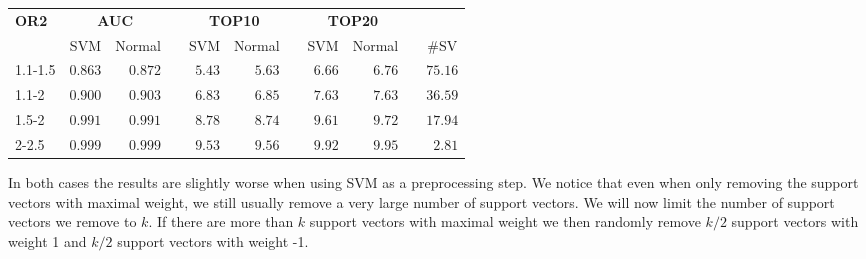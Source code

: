 \documentclass{article}\usepackage[]{graphicx}\usepackage[]{color}
\begin{document}
%
\begin{table}[H]
\begin{center}
\begin{tabular}{lrrcrrcrrcr}
\hline\hline
\multicolumn{1}{l}{\bfseries OR2}&\multicolumn{2}{c}{\bfseries AUC}&\multicolumn{1}{c}{\bfseries }&\multicolumn{2}{c}{\bfseries TOP10}&\multicolumn{1}{c}{\bfseries }&\multicolumn{2}{c}{\bfseries TOP20}&\multicolumn{1}{c}{\bfseries }&\multicolumn{1}{c}{\bfseries }\tabularnewline
\cline{2-3} \cline{5-6} \cline{8-9}
\multicolumn{1}{l}{}&\multicolumn{1}{c}{SVM}&\multicolumn{1}{c}{Normal}&\multicolumn{1}{c}{}&\multicolumn{1}{c}{SVM}&\multicolumn{1}{c}{Normal}&\multicolumn{1}{c}{}&\multicolumn{1}{c}{SVM}&\multicolumn{1}{c}{Normal}&\multicolumn{1}{c}{}&\multicolumn{1}{c}{\#SV}\tabularnewline
\hline
1.1-1.5&$0.863$&$0.872$&&$5.43$&$5.63$&&$6.66$&$6.76$&&$75.16$\tabularnewline
1.1-2&$0.900$&$0.903$&&$6.83$&$6.85$&&$7.63$&$7.63$&&$36.59$\tabularnewline
1.5-2&$0.991$&$0.991$&&$8.78$&$8.74$&&$9.61$&$9.72$&&$17.94$\tabularnewline
2-2.5&$0.999$&$0.999$&&$9.53$&$9.56$&&$9.92$&$9.95$&&$ 2.81$\tabularnewline
\hline
\end{tabular}
\end{center}
\end{table}




In both cases the results are slightly worse when using SVM as a preprocessing step. We notice that even when only removing the support vectors with maximal weight, we still usually remove a very large number of support vectors. We will now limit the number of support vectors we remove to $k$. If there are more than $k$ support vectors with maximal weight we then randomly remove $k/2$ support vectors with weight 1 and $k/2$ support vectors with weight -1.
\end{document}
